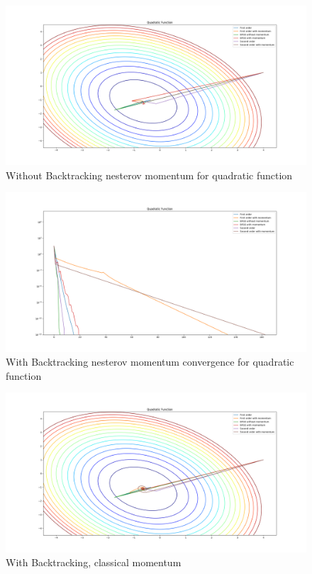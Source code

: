 \documentclass{article}
\begin{document}
\begin{figure}[H]
	\includegraphics[width=\linewidth]{../Images/quadraticnesterovbacktrack.png}
	\caption{Without Backtracking nesterov momentum for quadratic function}
	\label{fig:With Backtracking nesterov momentum for quadratic function}
\end{figure}

\begin{figure}[H]
	\includegraphics[width=\linewidth]{../Images/quadraticnesterovbacktrack1.png}
	\caption{With Backtracking nesterov momentum convergence for quadratic function}
	\label{fig:With Backtracking nesterov momentum convergence for quadratic function}
\end{figure}

\begin{figure}[H]
	\includegraphics[width=\linewidth]{../Images/quadraticmomentumbacktrack.png}
	\caption{With Backtracking, classical momentum}
	\label{fig:With Backtracking, classical momentum for quadratic function}
\end{figure}
\end{document}
